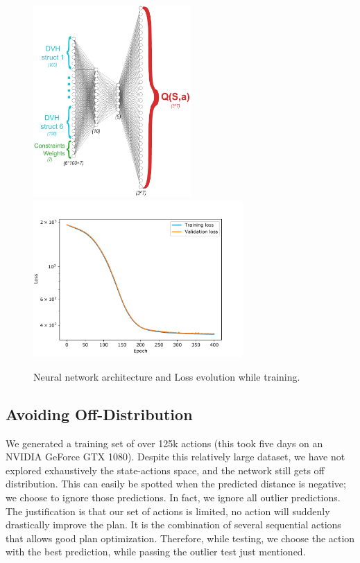 \begin{figure}
	\centering
	\includegraphics[width=6cm]{architecture_all_actions.pdf}
	\hspace{0.5cm}
	\includegraphics[width=8cm]{losses-distance.pdf}
	\caption{Neural network architecture and Loss evolution while training.}
	\label{fig:architecture}
\end{figure}

\subsection{Avoiding Off-Distribution}
We generated a training set of over 125k actions (this took five days on an NVIDIA GeForce GTX 1080).
Despite this relatively large dataset, we have not explored exhaustively the state-actions space, and the network still gets off distribution.
This can easily be spotted when the predicted distance is negative; we choose to ignore those predictions.
In fact, we ignore all outlier predictions.
The justification is that our set of actions is limited, no action will suddenly drastically improve the plan.
It is the combination of several sequential actions that allows good plan optimization.
Therefore, while testing, we choose the action with the best prediction, while passing the outlier test just mentioned.


